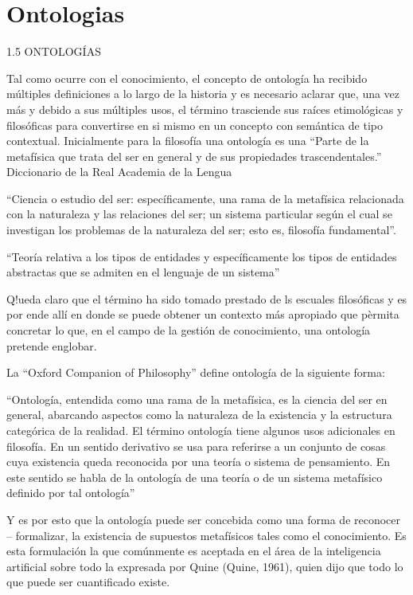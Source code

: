 \section {Ontologias}


1.5 ONTOLOGÍAS

Tal como ocurre con el conocimiento, el concepto de ontología ha recibido múltiples definiciones a lo largo de la historia y es necesario aclarar que, una vez más y debido a sus múltiples usos, el término trasciende sus raíces etimológicas y filosóficas para convertirse en si mismo en un concepto con semántica de tipo contextual. Inicialmente para la filosofía una ontología es una 
“Parte de la metafísica que trata del ser en general y de sus propiedades trascendentales.” Diccionario de la Real Academia de la Lengua

“Ciencia o estudio del ser: específicamente, una rama de la metafísica relacionada con la naturaleza y las relaciones del ser; un sistema particular según el cual se investigan los problemas de la naturaleza del ser; esto es, filosofía fundamental”.

“Teoría relativa a los tipos de entidades y específicamente los tipos de entidades abstractas que se admiten en el lenguaje de un sistema” 

Q!ueda claro que el término ha sido tomado prestado de ls escuales filosóficas y es por ende allí en donde se puede obtener un contexto más apropiado que pèrmita concretar lo que, en el campo de la gestión de conocimiento, una ontología pretende englobar.

La “Oxford Companion of Philosophy” define ontología de la siguiente forma: 

 “Ontología, entendida como una rama de la metafísica, es la ciencia del ser en general,       abarcando aspectos como la naturaleza de la existencia y la estructura categórica de la       realidad. El término ontología tiene algunos usos adicionales en filosofía. En un sentido       derivativo se usa para referirse a un conjunto de cosas cuya existencia queda reconocida por una teoría o sistema de pensamiento. En este sentido se habla de la ontología de una teoría o de un sistema metafísico definido por tal ontología”

Y es por esto que la ontología puede ser concebida como una forma de reconocer – formalizar, la existencia de supuestos metafísicos tales como el conocimiento. Es esta formulación la que comúnmente es aceptada en el área de la inteligencia artificial sobre todo la expresada por Quine (Quine, 1961), quien dijo que todo lo que puede ser cuantificado existe.

